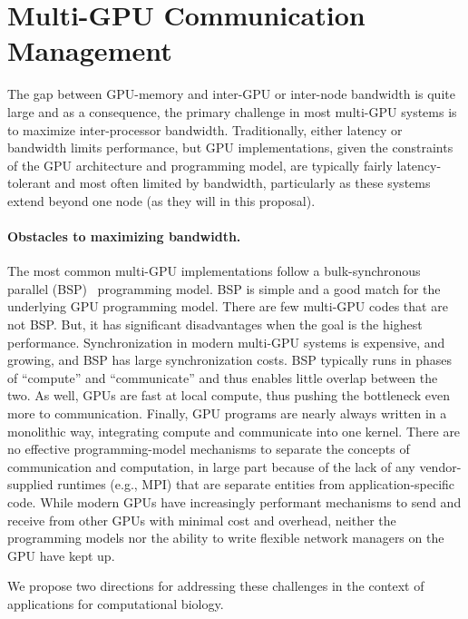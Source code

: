 
\section{Multi-GPU Communication Management}
\label{sec:multigpu}

The gap between GPU-memory and inter-GPU or inter-node bandwidth is quite large and as a consequence, the primary challenge in most multi-GPU systems is to maximize inter-processor bandwidth. Traditionally, either latency or bandwidth limits performance, but GPU implementations, given the constraints of the GPU architecture and programming model, are typically fairly latency-tolerant and most often limited by bandwidth, particularly as these systems extend beyond one node (as they will in this proposal). %

\paragraph{Obstacles to maximizing bandwidth.}
The most common multi-GPU implementations follow a bulk-synchronous parallel (BSP)~\cite{Valiant:1990:ABM} programming model. BSP is simple and a good match for the underlying GPU programming model. There are few multi-GPU codes that are not BSP\@. But, it has significant disadvantages when the goal is the highest performance. Synchronization in modern multi-GPU systems is expensive, and growing, and BSP has large synchronization costs. BSP typically runs in phases of ``compute'' and ``communicate'' and thus enables little overlap between the two. As well, GPUs are fast at local compute, thus pushing the bottleneck even more to communication. Finally, GPU programs are nearly always written in a monolithic way, integrating compute and communicate into one kernel. There are no effective programming-model mechanisms to separate the concepts of communication and computation, in large part because of the lack of any vendor-supplied runtimes (e.g., MPI) that are separate entities from application-specific code. While modern GPUs have increasingly performant mechanisms to send and receive from other GPUs with minimal cost and overhead, neither the programming models nor the ability to write flexible network managers on the GPU have kept up.

We propose two directions for addressing these challenges in the context of applications for computational biology.

